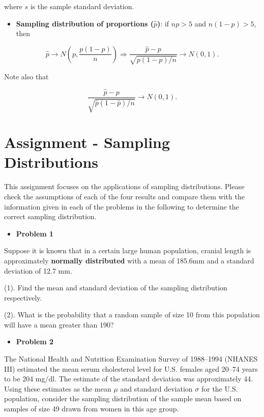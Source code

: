 \documentclass[
]{book}
\providecommand{\tightlist}{%
  \setlength{\itemsep}{0pt}\setlength{\parskip}{0pt}}
\begin{document}
where \(s\) is the sample standard deviation.

\begin{itemize}
\tightlist
\item
  \textbf{Sampling distribution of proportions (\(\hat{p}\))}: if \(np > 5\) and \(n(1-p) > 5\), then
\end{itemize}

\[
\hat{p} \to N\left( p, \frac{p(1-p)}{n} \right) \Rightarrow \frac{\hat{p}-p}{\sqrt{p(1-p)/n}} \to N(0, 1).
\]

Note also that

\[
\frac{\hat{p}-p}{\sqrt{\hat{p}(1-\hat{p})/n}} \to N(0, 1).
\]

\hypertarget{assignment---sampling-distributions}{%
\section{Assignment - Sampling Distributions}\label{assignment---sampling-distributions}}

This assignment focuses on the applications of sampling distributions. Please check the assumptions of each of the four results and compare them with the information given in each of the problems in the following to determine the correct sampling distribution.

\begin{itemize}
\tightlist
\item
  \textbf{Problem 1}
\end{itemize}

Suppose it is known that in a certain large human population, cranial length is approximately
\textbf{normally distributed} with a mean of 185.6mm and a standard deviation of 12.7 mm.

(1). Find the mean and standard deviation of the sampling distribution respectively.

(2). What is the probability that a random sample of size 10 from this population will have a
mean greater than 190?

\begin{itemize}
\tightlist
\item
  \textbf{Problem 2}
\end{itemize}

The National Health and Nutrition Examination Survey of 1988--1994 (NHANES III) estimated the mean serum cholesterol level for U.S. females aged 20--74 years to be 204 mg/dl. The estimate of the standard deviation was approximately 44. Using these estimates as the mean \(\mu\) and standard deviation \(\sigma\) for the U.S. population, consider the sampling distribution of the sample mean based on samples of size 49 drawn from women in this age group.
\end{document}
